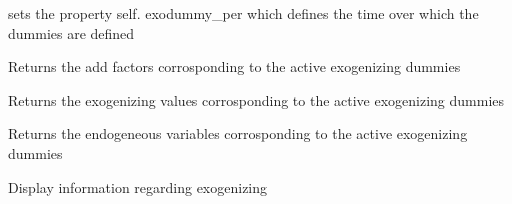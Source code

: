 \documentclass[letterpaper,10pt,english]{sphinxmanual}
\begin{document}
\begin{fulllineitems}
\begin{fulllineitems}
\sphinxAtStartPar
sets the property self. exodummy\_per which defines the time over which the dummies are defined

\end{fulllineitems}


\begin{fulllineitems}
\label{\detokenize{index:modelclass.WB_Mixin.fix_add_factor_fixed}}
\pysigstartsignatures
{}
\pysigstopsignatures
\sphinxAtStartPar
Returns the add factors corrosponding to the active exogenizing dummies

\end{fulllineitems}


\begin{fulllineitems}
\label{\detokenize{index:modelclass.WB_Mixin.fix_value_fixed}}
\pysigstartsignatures
{}
\pysigstopsignatures
\sphinxAtStartPar
Returns the exogenizing values corrosponding to the active exogenizing dummies

\end{fulllineitems}


\begin{fulllineitems}
\label{\detokenize{index:modelclass.WB_Mixin.fix_endo_fixed}}
\pysigstartsignatures
{}
\pysigstopsignatures
\sphinxAtStartPar
Returns the endogeneous variables corrosponding to the active exogenizing dummies

\end{fulllineitems}


\begin{fulllineitems}
\label{\detokenize{index:modelclass.WB_Mixin.fix_inf}}
\pysigstartsignatures
{}
\pysigstopsignatures
\sphinxAtStartPar
Display information regarding exogenizing

\end{fulllineitems}


\end{fulllineitems}
\end{document}
